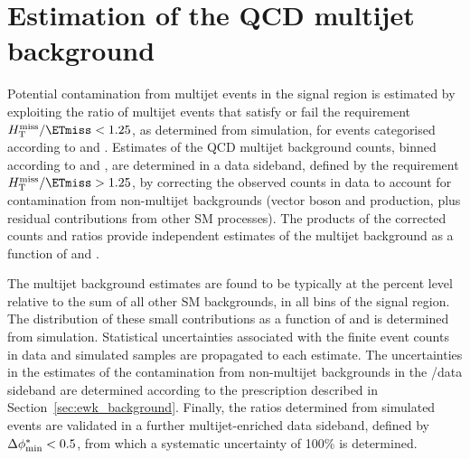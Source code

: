 \section{Estimation of the QCD multijet background}
\label{sec:qcd_background}


Potential contamination from multijet events in the signal region is
estimated by exploiting the ratio of multijet events that satisfy or
fail the requirement $\HTmiss/\ETmiss < 1.25$, as determined from
simulation, for events categorised according to \njet and
\scalht. Estimates of the QCD multijet background counts, binned
according to \njet and \scalht, are determined in a data sideband,
defined by the requirement $\HTmiss/\ETmiss > 1.25$, by correcting the
observed counts in data to account for contamination from non-multijet
backgrounds (vector boson and \ttbar production, plus residual
contributions from other SM processes). The products of the corrected
counts and ratios provide independent estimates of the multijet
background as a function of \njet and \scalht.

The multijet background estimates are found to be typically at the
percent level relative to the sum of all other SM backgrounds, in all
bins of the signal region. The distribution of these small
contributions as a function of \nb and \mht is determined from
simulation. Statistical uncertainties associated with the finite event
counts in data and simulated samples are propagated to each
estimate. The uncertainties in the estimates of the contamination from
non-multijet backgrounds in the \HTmiss/\ETmiss data sideband are
determined according to the prescription described in
Section~\ref{sec:ewk_background}. Finally, the ratios determined from
simulated events are validated in a further multijet-enriched data
sideband, defined by $\Delta\phi^{*}_{\rm min} < 0.5$, from which a systematic
uncertainty of 100\% is determined.

